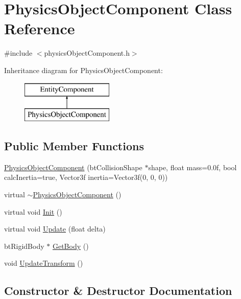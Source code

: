 \hypertarget{class_physics_object_component}{}\section{Physics\+Object\+Component Class Reference}
\label{class_physics_object_component}


{\ttfamily \#include $<$physics\+Object\+Component.\+h$>$}

Inheritance diagram for Physics\+Object\+Component\+:\begin{figure}[H]
\begin{center}
\leavevmode
\includegraphics[height=2.000000cm]{class_physics_object_component}
\end{center}
\end{figure}
\subsection*{Public Member Functions}
\begin{DoxyCompactItemize}
\item 
\hyperlink{class_physics_object_component_a3411bc1cdf04a16461a046e4ca63ca9a}{Physics\+Object\+Component} (bt\+Collision\+Shape $\ast$shape, float mass=0.\+0f, bool calc\+Inertia=true, Vector3f inertia=\+Vector3f(0, 0, 0))
\item 
virtual \hyperlink{class_physics_object_component_ae850bb2f556a14a79e22bca7d2999dee}{$\sim$\+Physics\+Object\+Component} ()
\item 
virtual void \hyperlink{class_physics_object_component_a9383128bd0b76d2289664053bca5c770}{Init} ()
\item 
virtual void \hyperlink{class_physics_object_component_ab06a52c369ed9cef4852309a0e97fa1c}{Update} (float delta)
\item 
bt\+Rigid\+Body $\ast$ \hyperlink{class_physics_object_component_af9a3bf0a2ea6aaf4c69a6c5e7dca5a73}{Get\+Body} ()
\item 
void \hyperlink{class_physics_object_component_a7bde28d4e0e1c44cd95e2870d03d917a}{Update\+Transform} ()
\end{DoxyCompactItemize}


\subsection{Constructor \& Destructor Documentation}
\hypertarget{class_physics_object_component_a3411bc1cdf04a16461a046e4ca63ca9a}{}
